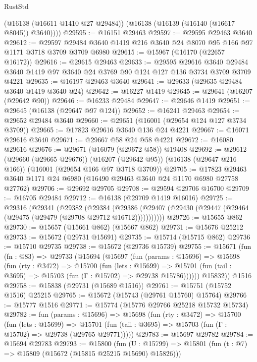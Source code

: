 \begin{lexlean}{RustStd}
\begin{coremodule}
        (@16138 (@16611 @1410 @27 @29484))
        (@16138 (@16139 (@16140 (@16617 @8045)) @3640))))
@29595 := @16151 @29463
@29597 := @29595 @29463 @3640
@29612 := @29597 @29484 @3640 @1419 @216 @3640 @24 @8070 @95 @166 @97 @1171 @3718 @3709 @3709 @6980
@29615 := @15967 (@16170 (@22657 @16172))
@29616 := @29615 @29463
@29633 := @29595
    @29616
    @3640
    @29484
    @3640
    @1419
    @97
    @3640
    @24
    @3769
    @90
    @124
    @127
    @136
    @3734
    @3709
    @3709
    @4221
@29635 := @16197 @29463 @3640
@29641 := @29633 (@29635 @29484 @3640 @1419 @3640 @24)
@29642 := @16227 @1419
@29645 := @29641 (@16207 (@29642 @90))
@29646 := @16233 @29484
@29647 := @29646 @1419
@29651 := @29645 (@16138 (@29647 @97 @124))
@29652 := @16241 @29463
@29654 := @29652 @29484 @3640
@29660 := @29651 (@16001 (@29654 @124 @127 @3734 @3709))
@29665 := @17823 @29616 @3640 @136 @24 @4221
@29667 := @16071 @29616 @3640
@29671 := @29667 @58 @24 @58 @4221
@29672 := @16080 @29616
@29676 := @29671 (@16079 (@29672 @58)) @19408
@29692 := @29612
    (@29660 (@29665 @29676))
    (@16207 (@29642 @95))
    (@16138 (@29647 @216 @166))
    (@16001 (@29654 @166 @97 @3718 @3709))
@29705 := @17823 @29463 @3640 @1171 @24 @6980 (@16490 @29463 @3640 @24 @1170 @6980 @27758 @27762)
@29706 := @29692 @29705
@29708 := @29594 @29706 @16700
@29709 := @16705 @29484
@29712 := @16138 (@29709 @1419 @16016)
@29725 := @29316
    (@29341
      (@29382
        (@29384
          (@29386 (@29407 (@29430 (@29447 (@29464 (@29475 (@29479 (@29708 @29712 @16712)))))))))))
@29726 := @15655 @862
@29730 := @15657 (@15661 @862) (@15667 @862)
@29731 := @15676 @25212
@29733 := @15672 (@29731 @15691)
@29735 := @15714 (@15715 @862)
@29736 := @15710 @29735
@29738 := @15672 (@29736 @15739)
@29755 := @15671
    (fun (fn : @83) =>
    @29733
      (@15694
        (@15697
          (fun (params : @15696) =>
          @15698
            (fun (rty : @3472) =>
            @15700
              (fun (lets : @15699) =>
              @15701 (fun (tail : @3695) => @15703 (fun (Γ : @15702) => @29738 @15786))))))
        @15832))
    @1516
@29758 := @15838 (@29731 (@15689 @1516))
@29761 := @15751 (@15752 @1516) @25215
@29765 := @15672 (@15743 (@29761 @15760) @15764)
@29766 := @15777 @1516
@29771 := @15774 (@15776 @29766 @25218 @15732 @15734)
@29782 := fun (params : @15696) =>
  @15698
    (fun (rty : @3472) =>
    @15700
      (fun (lets : @15699) =>
      @15701 (fun (tail : @3695) => @15703 (fun (Γ : @15702) => @29738 (@29765 @29771)))))
@29783 := @15697 @29782
@29784 := @15694 @29783
@29793 := @15800
    (fun (U : @15799) => @15801 (fun (t : @7) => @15809 (@15672 (@15815 @25215 @15690) @15826)))

\end{coremodule}
\end{lexlean}
